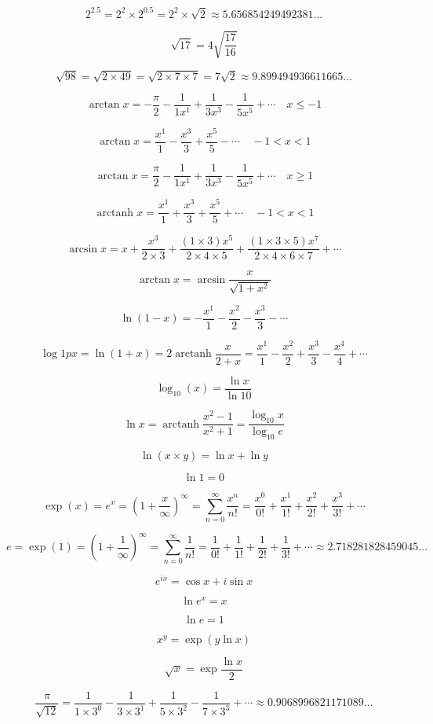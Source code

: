 \documentclass{article}
\DeclareMathOperator{\arctanh}{arctanh}
\begin{document}
\center

$$2^{2.5} = 2^2 \times 2^{0.5} = 2^2 \times \sqrt{2} \approx 5.656854249492381...$$

$$\sqrt{17} = 4\sqrt{\frac{17}{16}}$$

$$\sqrt{98} = \sqrt{2\times49} = \sqrt{2\times7\times7} = 7\sqrt{2}\approx9.899494936611665...$$

$$\arctan x = -\frac{\pi}{2} - \frac{1}{1x^1} + \frac{1}{3x^3} - \frac{1}{5x^5} + \cdots
\quad x \leq -1$$

$$\arctan x = \frac{x^1}{1} - \frac{x^3}{3} + \frac{x^5}{5} - \cdots \quad-1 < x < 1$$

$$\arctan x = \frac{\pi}{2} - \frac{1}{1x^1} + \frac{1}{3x^3} - \frac{1}{5x^5} + \cdots
\quad x \geq 1$$

$$\arctanh x = \frac{x^1}{1} + \frac{x^3}{3} + \frac{x^5}{5} +\cdots \quad-1 < x < 1$$

$$\arcsin x =
x + \frac{x^3}{2\times3} + \frac{(1\times3)x^5}{2\times4\times5} +
\frac{(1\times3\times5)x^7}{2\times4\times6\times7}+\cdots$$

$$\arctan x = \arcsin\frac{x}{\sqrt{1+x^2}}$$

$$\ln(1-x) = -\frac{x^1}{1} - \frac{x^2}{2} - \frac{x^3}{3} - \cdots$$

$$\log1p x = \ln(1+x) =
2\arctanh\frac{x}{2+x}=
\frac{x^1}{1} - \frac{x^2}{2} + \frac{x^3}{3} - \frac{x^4}{4} + \cdots$$

$$\log_{10}(x) = \frac{\ln{x}}{\ln{10}}$$

$$\ln x = \arctanh\frac{x^2-1}{x^2+1} = \frac{\log_{10}x}{\log_{10}e}$$

$$\ln(x\times y) = \ln x + \ln y$$

$$\ln 1 = 0$$

$$\exp(x) = e^x = (1 + \frac{x}{\infty})^\infty =
\sum_{n=0}^\infty \frac{x^n}{n!} =
\frac{x^0}{0!} + \frac{x^1}{1!} + \frac{x^2}{2!} + \frac{x^3}{3!} + \cdots$$

$$e = \exp(1) = (1 + \frac{1}{\infty})^\infty = \sum_{n=0}^\infty \frac{1}{n!} =
\frac{1}{0!} + \frac{1}{1!} + \frac{1}{2!} + \frac{1}{3!} + \cdots \approx 2.718281828459045...$$

$$e^{ix} = \cos x + i\sin x$$

$$\ln e^x = x$$

$$\ln e = 1$$

$$x^y = \exp(y\ln x)$$

$$\sqrt{x} = \exp\frac{\ln x}{2}$$

$$\frac{\pi}{\sqrt{12}} =
\frac{1}{1\times3^0}-\frac{1}{3\times3^1}+\frac{1}{5\times3^2}-\frac{1}{7\times3^3}+
\cdots\approx0.9068996821171089...$$
\end{document}
